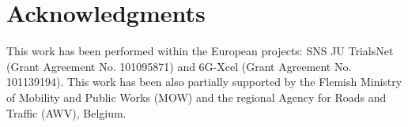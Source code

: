 \section*{Acknowledgments}\label{sec:Acknowledgments}
This work has been performed within the European projects: SNS JU TrialsNet (Grant Agreement No. 101095871) and 6G-Xcel (Grant Agreement No. 101139194).
This work has been also partially supported by the Flemish Ministry of Mobility and Public Works (MOW) and the regional Agency for Roads and Traffic (AWV), Belgium.